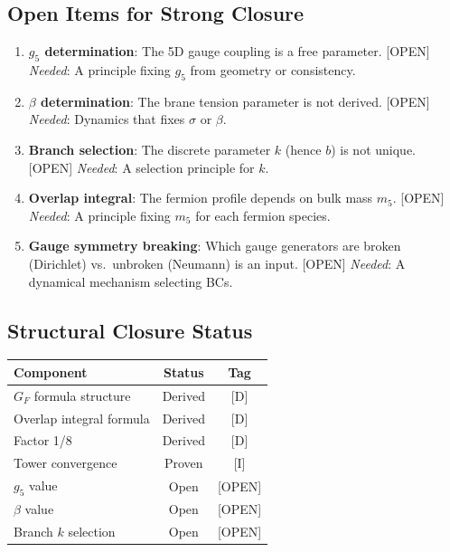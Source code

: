\documentclass[11pt,a4paper]{article}
\begin{document}
\subsection{Open Items for Strong Closure}

\begin{enumerate}
\item \textbf{$g_5$ determination}: The 5D gauge coupling is a free parameter. [OPEN]
      \textit{Needed}: A principle fixing $g_5$ from geometry or consistency.

\item \textbf{$\beta$ determination}: The brane tension parameter is not derived. [OPEN]
      \textit{Needed}: Dynamics that fixes $\sigma$ or $\beta$.

\item \textbf{Branch selection}: The discrete parameter $k$ (hence $b$) is not unique. [OPEN]
      \textit{Needed}: A selection principle for $k$.

\item \textbf{Overlap integral}: The fermion profile depends on bulk mass $m_5$. [OPEN]
      \textit{Needed}: A principle fixing $m_5$ for each fermion species.

\item \textbf{Gauge symmetry breaking}: Which gauge generators are broken (Dirichlet)
      vs.\ unbroken (Neumann) is an input. [OPEN]
      \textit{Needed}: A dynamical mechanism selecting BCs.
\end{enumerate}

\subsection{Structural Closure Status}

\begin{center}
\begin{tabular}{lcc}
\toprule
Component & Status & Tag \\
\midrule
$G_F$ formula structure & Derived & [D] \\
Overlap integral formula & Derived & [D] \\
Factor 1/8 & Derived & [D] \\
Tower convergence & Proven & [I] \\
$g_5$ value & Open & [OPEN] \\
$\beta$ value & Open & [OPEN] \\
Branch $k$ selection & Open & [OPEN] \\
\bottomrule
\end{tabular}
\end{center}
\end{document}
